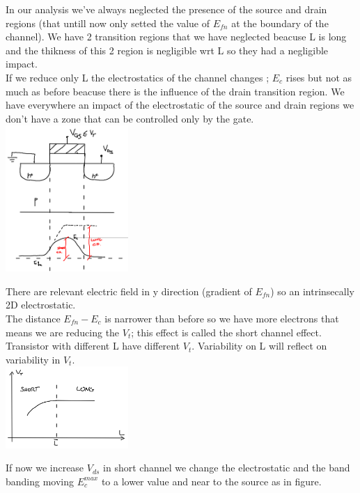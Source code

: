 In our analysis we've always neglected the presence of the source and drain regions (that untill now only setted the value of $E_{fn}$ at the boundary of the channel). We have 2 transition regions that we have neglected beacuse L is long and the thikness of this 2 region is negligible wrt L so they had a negligible impact.\\
If we reduce only L the electrostatics of the channel changes ; $E_c$ rises but not as much as before beacuse there is the influence of the drain transition region. We have everywhere an impact of the electrostatic of the source and drain regions we don't have a zone that can be controlled only by the gate.\\

\centering
\includegraphics[width=0.35\textwidth]{shortch.png}\\
\raggedright

There are relevant electric field in y direction (gradient of $E_{fn}$) so an intrinsecally 2D electrostatic.\\
The distance $E_{fn}-E_c$ is narrower than before so we have more electrons that means we are reducing the $V_t$; this effect is called the short channel effect. Transistor with different L have different $V_t$. Variability on L will reflect on variability in $V_t$.\\

\centering
\includegraphics[width=0.35\textwidth]{shortcheff.png}\\
\raggedright

If now we increase $V_{ds}$ in short channel we change the electrostatic and the band banding moving $E_c^{max}$ to a lower value and near to the source as in figure.\\

